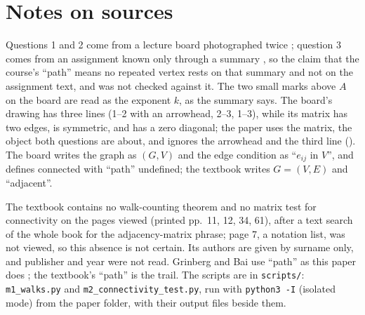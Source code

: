 \section*{Notes on sources}

Questions 1 and 2 come from a lecture board photographed twice \cite{whiteboard1,whiteboard2}; question 3 comes from an assignment known only through a summary \cite{user_statements}, so the claim that the course's ``path'' means no repeated vertex rests on that summary and not on the assignment text, and was not checked against it. The two small marks above $A$ on the board are read as the exponent $k$, as the summary says. The board's drawing has three lines (1--2 with an arrowhead, 2--3, 1--3), while its matrix has two edges, is symmetric, and has a zero diagonal; the paper uses the matrix, the object both questions are about, and ignores the arrowhead and the third line (). The board writes the graph as $(G, V)$ and the edge condition as ``$e_{ij}$ in $V$'', and defines connected with ``path'' undefined; the textbook writes $G = (V,E)$ and ``adjacent''.

The textbook contains no walk-counting theorem and no matrix test for connectivity on the pages viewed (printed pp.~11, 12, 34, 61), after a text search of the whole book for the adjacency-matrix phrase; page 7, a notation list, was not viewed, so this absence is not certain. Its authors are given by surname only, and publisher and year were not read. Grinberg and Bai use ``path'' as this paper does \cite{grinberg_graph_theory,bai_bimsa_adjacency}; the textbook's ``path'' is the trail. The scripts are in \texttt{scripts/}: \texttt{m1\_walks.py} and \texttt{m2\_connectivity\_test.py}, run with \texttt{python3 -I} (isolated mode) from the paper folder, with their output files beside them.
